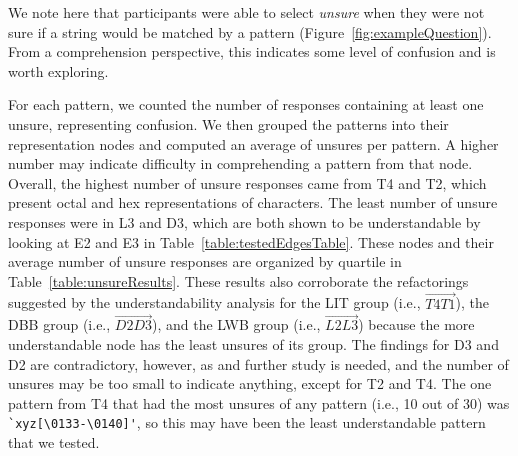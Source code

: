 We note here that participants were able to select \emph{unsure} when they were not sure if a string would be matched by a pattern (Figure~\ref{fig:exampleQuestion}). From a comprehension perspective, this indicates some level of confusion and is worth exploring.



For each pattern, we counted the number of responses containing at least one unsure, representing confusion.
We then grouped the patterns into their representation nodes and computed an average of unsures per pattern.
A higher number may indicate difficulty in comprehending a pattern from that node.
Overall, the highest number of unsure responses came from T4 and T2, which present octal and hex representations of characters. The least number of unsure responses were in L3 and D3, which are both shown to be understandable by looking at E2 and E3 in Table~\ref{table:testedEdgesTable}.
These nodes and their average number of unsure responses are organized by quartile in Table~\ref{table:unsureResults}.
These results also corroborate the refactorings suggested by the understandability analysis for the LIT group (i.e., $\overrightarrow{T4 T1}$), the DBB group (i.e.,  $\overrightarrow{D2 D3}$), and the LWB group (i.e., $\overrightarrow{L2 L3}$) because the more understandable node has the least unsures of its group.
The findings for D3 and D2 are contradictory, however, as  and further study is needed, and the number of unsures may be too small to indicate anything, except for T2 and T4.  The one pattern from T4 that had the most unsures of any pattern (i.e., 10 out of 30) was \verb!`xyz[\0133-\0140]'!, so this may have been the least understandable pattern that we tested.
